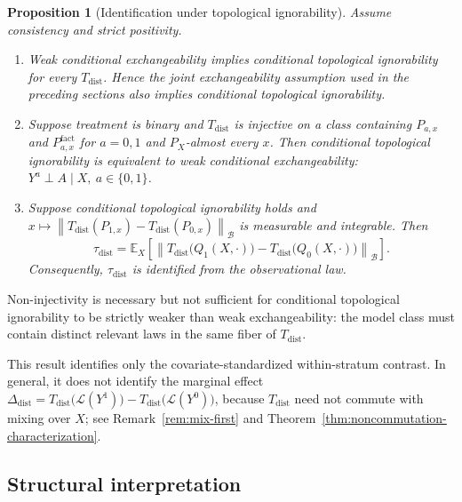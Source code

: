 \documentclass[11pt,a4paper]{article}
\theoremstyle{plain}
\newtheorem{proposition}[theorem]{Proposition}
\theoremstyle{definition}
\theoremstyle{remark}
\newcommand{\1}{\mathbbm{1}}
\begin{document}
\begin{proposition}[Identification under topological ignorability]
\label{prop:tau-dist-ignorability}
Assume consistency and strict positivity.

\begin{enumerate}
\item Weak conditional exchangeability implies conditional topological ignorability for every \(T_{\mathrm{dist}}\). Hence the joint exchangeability assumption used in the preceding sections also implies conditional topological ignorability.

\item Suppose treatment is binary and \(T_{\mathrm{dist}}\) is injective on a class containing \(P_{a,x}\) and
\(P^{\mathrm{fact}}_{a,x}\) for \(a=0,1\) and
\(P_X\)-almost every \(x\). Then conditional topological ignorability is equivalent to weak conditional exchangeability: \(Y^a\perp A\mid X, \ a\in\{0,1\}\).

\item Suppose conditional topological ignorability holds and
\(x\longmapsto \left\| T_{\mathrm{dist}}(P_{1,x})
- T_{\mathrm{dist}}(P_{0,x}) \right\|_{\mathcal B}
\) is measurable and integrable. Then
\[
\tau_{\mathrm{dist}}
=
\mathbb E_X\!\left[
\left\|
T_{\mathrm{dist}}\bigl(Q_1(X,\cdot)\bigr)
-
T_{\mathrm{dist}}\bigl(Q_0(X,\cdot)\bigr)
\right\|_{\mathcal B}
\right].
\]
Consequently, \(\tau_{\mathrm{dist}}\) is identified from the observational law.
\end{enumerate}
\end{proposition}

Non-injectivity is necessary but not sufficient for conditional topological ignorability to be strictly weaker than weak exchangeability: the model class must contain distinct relevant laws in the same fiber of \(T_{\mathrm{dist}}\).

This result identifies only the covariate-standardized within-stratum contrast. In general, it does not identify the marginal effect
\(\Delta_{\mathrm{dist}} = T_{\mathrm{dist}}\bigl(\mathcal L(Y^1)\bigr) - T_{\mathrm{dist}}\bigl(\mathcal L(Y^0)\bigr)\), because \(T_{\mathrm{dist}}\) need not commute with mixing over \(X\); see Remark~\ref{rem:mix-first} and
Theorem~\ref{thm:noncommutation-characterization}.

\subsection{Structural interpretation}
\label{subsec:filtered-chambers}
\end{document}
